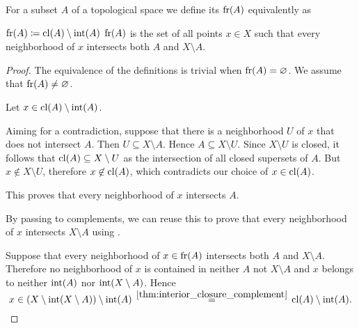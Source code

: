 \begin{definition}\label{def:topological_boundary}
  For a subset \( A \) of a topological space we define its  \( \operatorname{fr}(A) \) equivalently as
  \begin{thmenum}
     \( \operatorname{fr}(A) \coloneqq \operatorname{cl}(A) \setminus \operatorname{int}(A) \)
     \( \operatorname{fr}(A) \) is the set of all points \( x \in X \) such that every neighborhood of \( x \) intersects both \( A \) and \( X \setminus A \).
  \end{thmenum}
\end{definition}
\begin{proof}
  The equivalence of the definitions is trivial when \( \operatorname{fr}(A) = \varnothing \). We assume that \( \operatorname{fr}(A) \neq \varnothing \).

   Let \( x \in \operatorname{cl}(A) \setminus \operatorname{int}(A) \).

  Aiming for a contradiction, suppose that there is a neighborhood \( U \) of \( x \) that does not intersect \( A \). Then \( U \subseteq X \setminus A \). Hence \( A \subseteq X \setminus U \). Since \( X \setminus U \) is closed, it follows that \( \operatorname{cl}(A) \subseteq X \setminus U \) as the intersection of all closed supersets of \( A \). But \( x \not\in X \setminus U \), therefore \( x \not\in \operatorname{cl}(A) \), which contradicts our choice of \( x \in \operatorname{cl}(A) \).

  This proves that every neighborhood of \( x \) intersects \( A \).

  By passing to complements, we can reuse this to prove that every neighborhood of \( x \) intersects \( X \setminus A \) using .

   Suppose that every neighborhood of \( x \in \operatorname{fr}(A) \) intersects both \( A \) and \( X \setminus A \). Therefore no neighborhood of \( x \) is contained in neither \( A \) not \( X \setminus A \) and \( x \) belongs to neither \( \operatorname{int}(A) \) nor \( \operatorname{int}(X \setminus A) \). Hence
  \begin{equation*}
    x \in (X \setminus \inter(X \setminus A)) \setminus \inter(A) \reloset {\ref{thm:interior_closure_complement}} = \cl(A) \setminus \inter(A).
  \end{equation*}
\end{proof}

